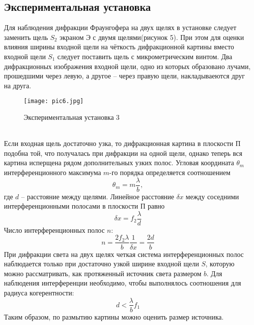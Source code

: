 \documentclass[12pt]{article}
\begin{document}
	\subsection{Экспериментальная установка}
	Для наблюдения дифракции Фраунгофера на двух щелях в установке следует заменить щель $S_2$ экраном Э с двумя щелями(рисунок 5). При этом для оценки влияния ширины входной щели на чёткость дифракционной картины вместо входной щели $S_1$ следует поставить щель с микрометрическим винтом. Два дифракционных изображения входной щели, одно из которых образовано лучами, прошедшими через левую, а другое -- через правую щели, накладываеются друг на друга. \\
	\begin{figure}[h]
		\centering	
		\texttt{[image: pic6.jpg]}
		\caption{Экспериментальная установка 3}
	\end{figure}\\
Если входная щель достаточно узка, то дифракционная картина в плоскости П подобна той, что получалась при дифракции на одной щели, однако теперь вся картина исперщена рядом дополнительных узких полос. Угловая координата $\theta_m$ интерференционного максимума $m$-го порядка определяется соотношением \begin{equation}
\theta_m = m \frac{\lambda}{b},
\end{equation}
где $d$ -- расстояние между щелями. Линейное расстояние $\delta x$ между соседними интерференционными полосами в плоскости П равно \begin{equation}
\delta x = f_2\frac{\lambda}{d}
\end{equation}
Число интерференционных полос $n$:
\begin{equation}
n = \frac{2f_2\lambda}{b}\frac{1}{\delta x} = \frac{2d}{b}
\end{equation} 
При дифракции света на двух щелях четкая система интерференционных полос наблюдается только при достаточно узкой ширине входной щели $S$, которую можно рассматривать, как протяженный источник света размером $b$. Для наблюдения интерференции необходимо, чтобы выполнялось соотношения для радиуса когерентности: \begin{equation}
d < \frac{\lambda}{b}f_1
\end{equation}
Таким образом, по размытию картины можно оценить размер источника.
\end{document}
